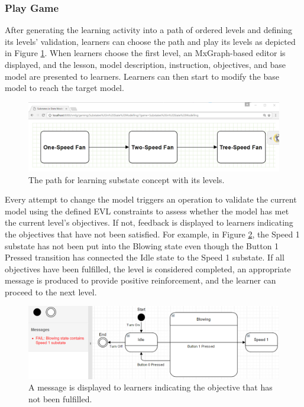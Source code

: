 \documentclass[12pt, a4paper]{report} \usepackage[titletoc]{appendix}
\begin{document}
\subsubsection{Play Game}
After generating the learning activity into a path of ordered levels and defining its levels' validation, learners can choose the path and play its levels as depicted in Figure \ref{path}. When learners choose the first level, an MxGraph-based editor is displayed, and the lesson, model description, instruction, objectives, and base model are presented to learners. Learners can then start to modify the base model to reach the target model. 

\begin{figure}[t!]
\centering
\includegraphics[width=12cm]{path}
\caption{The path for learning substate concept with its levels.}
\label{path}
\end{figure} 

Every attempt to change the model triggers an operation to validate the current model using the defined EVL constraints to assess whether the model has met the current level's objectives. If not, feedback is displayed to learners indicating the objectives that have not been satisfied. For example, in Figure \ref{example-fail-messages}, the Speed 1 substate has not been put into the Blowing state even though the Button 1 Pressed transition has connected the Idle state to the Speed 1 substate. If all objectives have been fulfilled, the level is considered completed, an appropriate message is produced to provide positive reinforcement, and the learner can proceed to the next level. 

\begin{figure}[t!]
\centering
\includegraphics[width=12cm]{example-fail-messages}
\caption{A message is displayed to learners indicating the objective that has not been fulfilled.}
\label{example-fail-messages}
\end{figure} 
\end{document}
